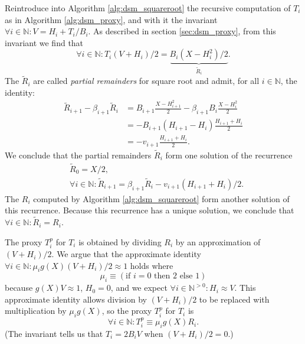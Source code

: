 \documentclass[10pt]{article}
\theoremstyle{definition}
\theoremstyle{remark}
\numberwithin{equation}{section}
\newcommand{\nats}{\mathbb{N}}
\newcommand{\pnats}{\mathbb{N}^{>0}}
\begin{document}
Reintroduce into Algorithm \ref{alg:dsm_squareroot} the recursive computation of $T_i$ as in Algorithm \ref{alg:dsm_proxy}, and with it the invariant $\forall i \in \nats: V = H_i + T_i/B_i$. As described in section \ref{sec:dsm_proxy}, from this invariant we find that
\[
\forall i \in \nats: T_i (V+H_i)/2 = \underbrace{B_i (X - H_i^2)/2}_{\tilde{R}_i}.
\]
The $\tilde{R}_i$ are called \emph{partial remainders} for square root and admit, for all $i \in \nats$, the identity:
\begin{align*} 
\tilde{R}_{i+1} - \beta_{i+1} \tilde{R}_i &= B_{i+1}\frac{X - H_{i+1}^2}{2} - \beta_{i+1} B_i \frac{X - H_i^2}{2} \\
&= - B_{i+1}(H_{i+1} - H_i)\frac{H_{i+1} + H_i}{2} \\
&= - v_{i+1}\frac{H_{i+1} + H_i}{2} .
\end{align*}
We conclude that the partial remainders $\tilde{R}_i$ form one solution of the recurrence 
\begin{align*}
&\tilde{R}_0 = X/2, \\ 
&\forall i \in \nats: 
\tilde{R}_{i+1} = \beta_{i+1} \tilde{R}_i - v_{i+1} (H_{i+1}+H_i)/2 .
\end{align*}
The $R_i$ computed by Algorithm \ref{alg:dsm_squareroot} form another solution of this recurrence. Because this recurrence has a unique solution, we conclude that $\forall i \in \nats: \tilde{R}_i = R_i$.

The proxy $T_i^p$ for $T_i$ is obtained by dividing $R_i$ by an approximation of $(V+H_i)/2$.  
We argue that the approximate identity $\forall i \in \nats: \mu_i g(X) (V+H_i)/2 \approx 1$ holds where
\[
\mu_i \equiv (\text{if $i = 0$ then $2$ else $1$})
\] 
because $g(X)V \approx 1$, $H_0 = 0$, and we expect $\forall i \in \pnats: H_i \approx V$. This approximate identity allows division by $(V+H_i)/2$ to be replaced with multiplication by $\mu_i g(X)$, so  the proxy $T_i^p$ for $T_i$ is 
\[
\forall i \in \nats: T^p_i \equiv \mu_i g(X) R_i .
\]
(The invariant tells us that $T_i = 2B_i V$ when $(V+H_i)/2 = 0$.)
\end{document}
